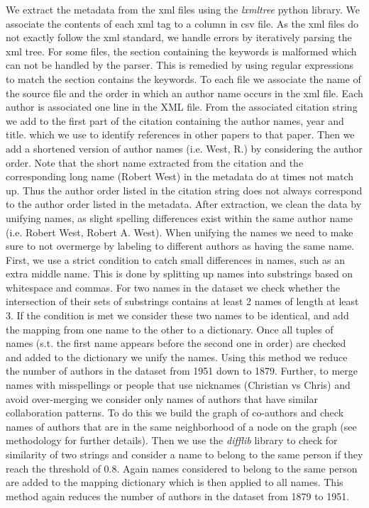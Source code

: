 \documentclass[journal,twocolumn]{IEEEtran}
\begin{document}
We extract the metadata from the xml files using the \emph{lxmltree}
python library. We associate the contents of each xml tag to a column in
csv file. As the xml files do not exactly follow the xml standard, we
handle errors by iteratively parsing the xml tree. For some files, the
section containing the keywords is malformed which can not be handled by
the parser. This is remedied by using regular expressions to match the
section contains the keywords. To each file we associate the name of the
source file and the order in which an author name occurs in the xml
file. Each author is associated one line in the XML file. From the
associated citation string we add to the first part of the citation
containing the author names, year and title. which we use to identify
references in other papers to that paper. Then we add a shortened
version of author names (i.e. West, R.) by considering the author order.
Note that the short name extracted from the citation and the
corresponding long name (Robert West) in the metadata do at times not
match up. Thus the author order listed in the citation string does not
always correspond to the author order listed in the metadata. After
extraction, we clean the data by unifying names, as slight spelling
differences exist within the same author name (i.e. Robert West, Robert
A. West). When unifying the names we need to make sure to not overmerge
by labeling to different authors as having the same name. First, we use
a strict condition to catch small differences in names, such as an extra
middle name. This is done by splitting up names into substrings based on
whitespace and commas. For two names in the dataset we check whether the
intersection of their sets of substrings contains at least 2 names of
length at least 3. If the condition is met we consider these two names
to be identical, and add the mapping from one name to the other to a
dictionary. Once all tuples of names (s.t. the first name appears before
the second one in order) are checked and added to the dictionary we
unify the names. Using this method we reduce the number of authors in
the dataset from 1951 down to 1879. Further, to merge names with
misspellings or people that use nicknames (Christian vs Chris) and avoid
over-merging we consider only names of authors that have similar
collaboration patterns. To do this we build the graph of co-authors and
check names of authors that are in the same neighborhood of a node on
the graph (see methodology for further details). Then we use the
\emph{difflib} library to check for similarity of two strings and
consider a name to belong to the same person if they reach the threshold
of 0.8. Again names considered to belong to the same person are added to
the mapping dictionary which is then applied to all names. This method
again reduces the number of authors in the dataset from 1879 to 1951.
\end{document}
